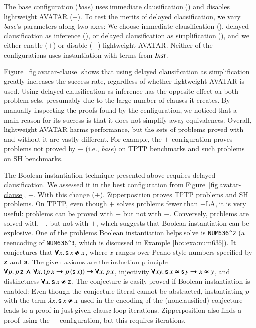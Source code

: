 The base configuration (\emph{base}) uses immediate clausification () and 
disables lightweight AVATAR ($-$). To test
the merits of delayed clausification, we vary \emph{base}'s parameters along two axes: We
choose immediate clausification (), delayed clausification as inference
(), or delayed clausification as simplification (), and we
either enable ($+$) or disable ($-$) lightweight AVATAR.
Neither of the configurations uses instantiation with terms from $\mathit{Inst}$.

Figure~\ref{fig:avatar-clause} shows that using delayed clausification as
simplification greatly increases the success rate, regardless of whether
lightweight AVATAR is used. Using delayed clausification as inference has the
opposite effect on both problem sets, presumably due to the large number of
clauses it creates. By manually inspecting the  proofs found by the 
configuration, we noticed that a main reason for its success is that it does
not simplify away equivalences.
%
Overall, lightweight AVATAR harms performance, but the sets of
problems proved with and without it are vastly different. For example,
the $+$ configuration proves  problems not
proved by $-$ (i.e., \emph{base}) on TPTP benchmarks and
 such problems on SH benchmarks.

The Boolean instantiation technique presented above requires delayed
clausification.
We assessed it in the best configuration from
Figure~\ref{fig:avatar-clause}, $-$. With this change ($+$),
Zipperposition proves  TPTP problems and  SH
problems.
On TPTP, even though $+$ solves  problems fewer
than $-$LA, it is very useful: 
problems can be proved with $+$ but not with $-$. 
Conversely,  problems are solved with $-$,
but not with $+$, which suggests that Boolean instantiation can be 
explosive.
%
One of the problems Boolean instantiation helps solve is \texttt{NUM636\^{}2} (a
reencoding of \texttt{NUM636\^{}3}, which is discussed in Example \ref{hot:exa:num636}).
It conjectures that $\pmb{\forall} x.\, \mathsf{s} \, x \pmb{\not\approx} x$, where $x$ ranges over
Peano-style numbers specified by $\mathsf{z}$ and $\mathsf{s}$. The given axioms are
the induction principle $\pmb{\forall} p.\, p \, \mathsf{z} \,\pmb{\land}\, \pmb{\forall} x. \, (p \,
x \pmb{\rightarrow} p \, (\mathsf{s} \, x)) \pmb{\rightarrow} \pmb{\forall} x. \, p\, x$, injectivity
$\pmb{\forall} x y. \, \mathsf{s}\,x \pmb{\approx} \mathsf{s}\,y \pmb{\rightarrow} x \pmb{\approx} y$, and
distinctness $\pmb{\forall} x. \, \mathsf{s}\,x \pmb{\not\approx} \mathsf{z}$. The conjecture is easily
proved if Boolean instantiation is enabled: Even though the conjecture literal
cannot be abstracted, instantiating $p$ with the term $\lambda x.\, \mathsf{s}
\, x \pmb{\not\approx} x$ used in the encoding of the (nonclausified) conjecture leads to a proof in just
 given clause loop iterations. Zipperposition also finds a
proof using the $-$ configuration, but this requires
 iterations.


